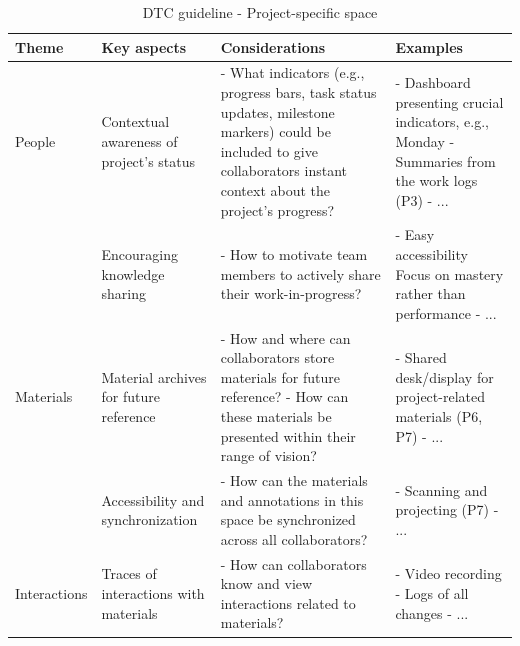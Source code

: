 \documentclass[11pt]{article}
\begin{document}
\clearpage
\begin{table}[ht]
\centering
\small
\caption{DTC guideline - Project-specific space}
\begin{tabular}{|l|p{3.2cm}|p{4.5cm}|p{4.5cm}|}
\hline
\textbf{Theme} & \textbf{Key aspects} & \textbf{Considerations} & \textbf{Examples} \\
\hline

People & Contextual awareness of project’s status 
& - What indicators (e.g., progress bars, task status updates, milestone markers) could be included to give collaborators instant context about the project’s progress?
& - Dashboard presenting crucial indicators, e.g., Monday\cite{monday} \newline
- Summaries from the work logs (P3) \newline
- ... \newline {~}\\

{~} & Encouraging knowledge sharing 
& - How to motivate team members to actively share their work-in-progress?
& - Easy accessibility \newline
Focus on mastery rather than performance\cite{kim2017mosaic} \newline
- ... \newline {~}\\
\hline

Materials & Material archives for future reference 
& - How and where can collaborators store materials for future reference? \newline
- How can these materials be presented within their range of vision?
& - Shared desk/display for project-related materials (P6, P7) \newline
- ... \newline {~}\\


{~} & Accessibility and synchronization 
& - How can the materials and annotations in this space be synchronized across all collaborators?
& - Scanning and projecting (P7) \newline
- ... \newline {~}\\
\hline

Interactions & Traces of interactions with materials 
& - How can collaborators know and view interactions related to materials?
& - Video recording \newline
- Logs of all changes \newline
- ... \newline {~}\\
\hline

\end{tabular}
\end{table}
\end{document}

